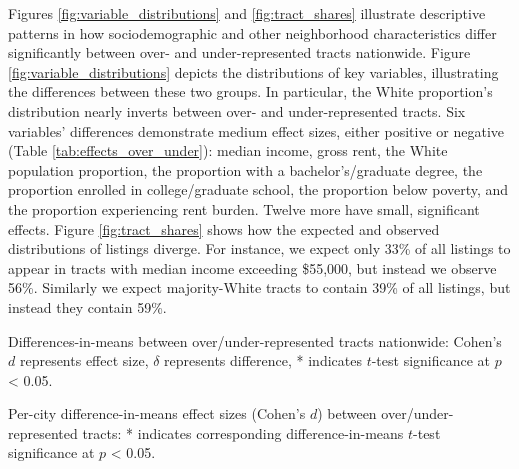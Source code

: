 \documentclass[11pt,letterpaper]{article}
\begin{document}
Figures \ref{fig:variable_distributions} and \ref{fig:tract_shares} illustrate descriptive patterns in how sociodemographic and other neighborhood characteristics differ significantly between over- and under-represented tracts nationwide. Figure \ref{fig:variable_distributions} depicts the distributions of key variables, illustrating the differences between these two groups. In particular, the White proportion's distribution nearly inverts between over- and under-represented tracts. Six variables' differences demonstrate medium effect sizes, either positive or negative (Table \ref{tab:effects_over_under}): median income, gross rent, the White population proportion, the proportion with a bachelor's/graduate degree, the proportion enrolled in college/graduate school, the proportion below poverty, and the proportion experiencing rent burden. Twelve more have small, significant effects. Figure \ref{fig:tract_shares} shows how the expected and observed distributions of listings diverge. For instance, we expect only 33\% of all listings to appear in tracts with median income exceeding \$55,000, but instead we observe 56\%. Similarly we expect majority-White tracts to contain 39\% of all listings, but instead they contain 59\%.

\begin{table}[tb]
	\centering
	\small
	\caption{Differences-in-means between over/under-represented tracts nationwide: Cohen's $d$ represents effect size, $\delta$ represents difference, * indicates $t$-test significance at $p$ < 0.05.}
	\label{tab:effects_over_under}
	
\end{table}

\begin{table}[tbp]
	\centering
	\footnotesize
	\caption{Per-city difference-in-means effect sizes (Cohen's $d$) between over/under-represented tracts: * indicates corresponding difference-in-means $t$-test significance at $p$ < 0.05.}
	\label{tab:effects_cities}
	
\end{table}
\end{document}
